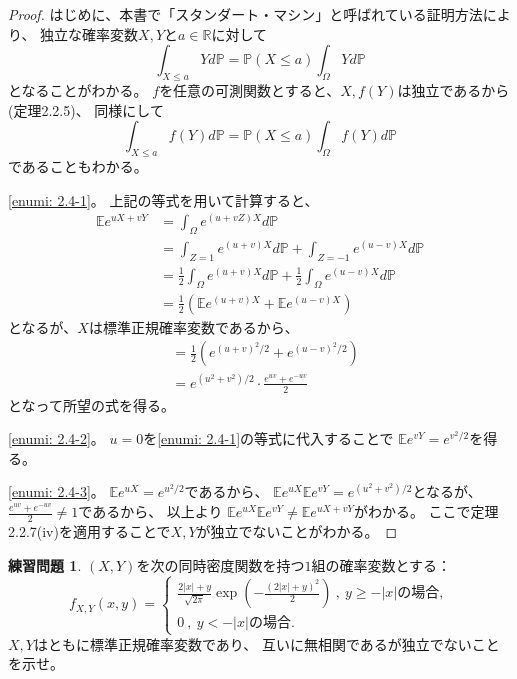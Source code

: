 \documentclass[uplatex]{jsarticle}
\theoremstyle{definition}
\newtheorem{prob}[prob]{練習問題}
\def\R{\mathbb{R}}
\def\P{\mathbb{P}}
\def\E{\mathbb{E}}
\begin{document}
\begin{proof}
  はじめに、本書で「スタンダート・マシン」と呼ばれている証明方法により、
  独立な確率変数\(X,Y\)と\(a\in \R\)に対して
  \[
  \int_{X\leq a}Yd\P = \P(X\leq a)\int_{\Omega}Yd\P
  \]
  となることがわかる。
  \(f\)を任意の可測関数とすると、\(X,f(Y)\)は独立であるから (定理2.2.5)、
  同様にして
  \[
  \int_{X\leq a}f(Y)d\P = \P(X\leq a)\int_{\Omega}f(Y)d\P
  \]
  であることもわかる。

  \ref{enumi: 2.4-1}。
  上記の等式を用いて計算すると、
  \begin{align*}
    \E e^{uX+vY} &= \int_{\Omega}e^{(u+vZ)X}d\P \\
    &= \int_{Z=1}e^{(u+v)X}d\P + \int_{Z=-1}e^{(u-v)X}d\P \\
    &= \frac{1}{2}\int_{\Omega}e^{(u+v)X}d\P
    + \frac{1}{2}\int_{\Omega}e^{(u-v)X}d\P \\
    &= \frac{1}{2}(\E e^{(u+v)X} + \E e^{(u-v)X})
  \end{align*}
  となるが、\(X\)は標準正規確率変数であるから、
  \begin{align*}
    &= \frac{1}{2}(e^{(u+v)^2/2}+e^{(u-v)^2/2}) \\
    &= e^{(u^2+v^2)/2}\cdot \frac{e^{uv}+e^{-uv}}{2}
  \end{align*}
  となって所望の式を得る。

  \ref{enumi: 2.4-2}。
  \(u=0\)を\ref{enumi: 2.4-1}の等式に代入することで
  \(\E e^{vY} = e^{v^2/2}\)を得る。

  \ref{enumi: 2.4-3}。
  \(\E e^{uX}=e^{u^2/2}\)であるから、
  \(\E e^{uX} \E e^{vY} = e^{(u^2+v^2)/2}\)となるが、
  \(\frac{e^{uv}+e^{-uv}}{2}\neq 1\)であるから、
  以上より
  \(\E e^{uX} \E e^{vY} \neq \E e^{uX+vY}\)がわかる。
  ここで定理2.2.7(iv)を適用することで\(X,Y\)が独立でないことがわかる。
\end{proof}


\begin{prob}\label{prob: 2.5}
  \((X,Y)\)を次の同時密度関数を持つ\(1\)組の確率変数とする：
  \[
  f_{X,Y}(x,y) =
  \begin{cases}
    \frac{2|x| + y}{\sqrt{2\pi}}\exp(-\frac{(2|x|+y)^2}{2}) \
    , \ \text{\(y\geq -|x|\)の場合}, \\
    0 \ , \ \text{\(y<-|x|\)の場合}.
  \end{cases}
  \]
  \(X,Y\)はともに標準正規確率変数であり、
  互いに無相関であるが独立でないことを示せ。
\end{prob}
\end{document}
